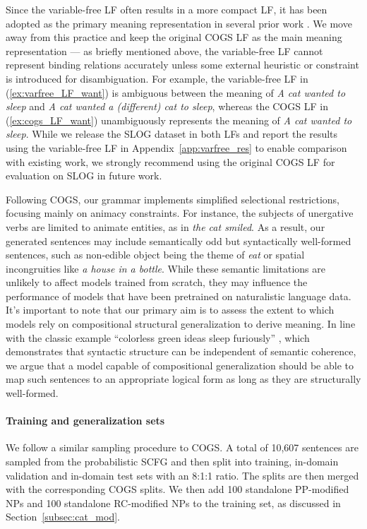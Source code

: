 Since the variable-free LF often results in a more compact LF, it has been adopted as the primary meaning representation in several prior work \citep{qiu-etal-2022-evaluating,drozdov2022compositional}. We move away from this practice and keep the original COGS LF as the main meaning representation --- as briefly mentioned above, the variable-free LF cannot represent binding relations accurately unless some external heuristic or constraint is introduced for disambiguation. For example, the variable-free LF in (\ref{ex:varfree_LF_want}) is ambiguous between the meaning of \textit{A cat wanted to sleep} and \textit{A cat wanted a (different) cat to sleep}, whereas the COGS LF in (\ref{ex:cogs_LF_want}) unambiguously represents the meaning of \textit{A cat wanted to sleep}. While we release the SLOG dataset in both LFs and report the results using the variable-free LF in Appendix~\ref{app:varfree_res} to enable comparison with existing work, we strongly recommend using the original COGS LF for evaluation on SLOG in future work.

Following COGS, our grammar implements simplified selectional restrictions, focusing mainly on animacy constraints. For instance, the subjects of unergative verbs are limited to animate entities, as in \textit{the cat smiled}. As a result, our generated sentences may include semantically odd but syntactically well-formed sentences, such as non-edible object being the theme of \textit{eat} or spatial incongruities like \textit{a house in a bottle}. While these semantic limitations are unlikely to affect models trained from scratch, they may influence the performance of models that have been pretrained on naturalistic language data.  It's important to note that our primary aim is to assess the extent to which models rely on compositional structural generalization to derive meaning. In line with the classic example ``colorless green ideas sleep furiously'' \cite{chomsky1957syntactic}, which demonstrates that syntactic structure can be independent of semantic coherence, we argue that a model capable of compositional generalization should be able to map such sentences to an appropriate logical form as long as they are structurally well-formed. 


\paragraph{Training and generalization sets} 
We follow a similar sampling procedure to COGS. A total of 10,607 sentences are sampled from the probabilistic SCFG and then split into training, in-domain validation and in-domain test sets with an 8:1:1 ratio. The splits are then merged with the corresponding COGS splits. We then add 100 standalone PP-modified NPs and 100 standalone RC-modified NPs to the training set, as discussed in Section~\ref{subsec:cat_mod}.

